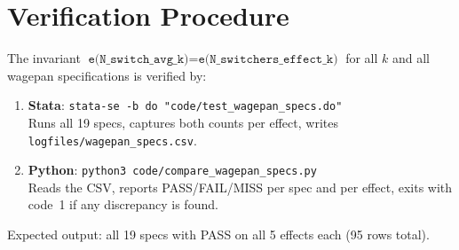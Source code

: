 \documentclass[11pt]{article}
\begin{document}
\section{Verification Procedure}

The invariant $\texttt{e(N\_switch\_avg\_k)} = \texttt{e(N\_switchers\_effect\_k)}$
for all $k$ and all wagepan specifications is verified by:

\begin{enumerate}[nosep]
  \item \textbf{Stata}: \texttt{stata-se -b do "code/test\_wagepan\_specs.do"}\\
        Runs all 19 specs, captures both counts per effect, writes
        \texttt{logfiles/wagepan\_specs.csv}.
  \item \textbf{Python}: \texttt{python3 code/compare\_wagepan\_specs.py}\\
        Reads the CSV, reports PASS/FAIL/MISS per spec and per effect,
        exits with code~1 if any discrepancy is found.
\end{enumerate}

Expected output: all 19 specs with PASS on all 5 effects each (95 rows total).
\end{document}

